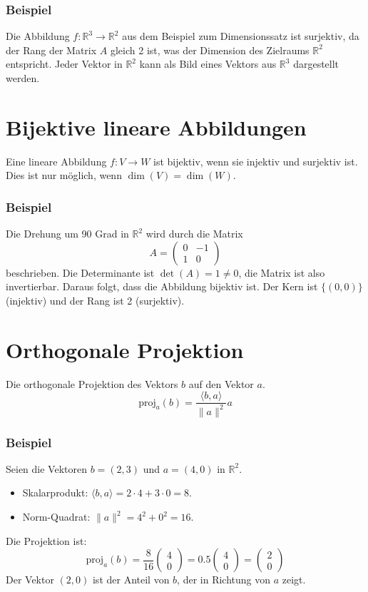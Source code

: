 \subsubsection{Beispiel}
Die Abbildung \(f: \mathbb{R}^3 \to \mathbb{R}^2\) aus dem Beispiel zum
Dimensionssatz ist surjektiv, da der Rang der Matrix \(A\) gleich 2 ist, was
der Dimension des Zielraums \(\mathbb{R}^2\) entspricht. Jeder Vektor in
\(\mathbb{R}^2\) kann als Bild eines Vektors aus \(\mathbb{R}^3\) dargestellt
werden.

\section{Bijektive lineare Abbildungen}
Eine lineare Abbildung \(f: V \to W\) ist bijektiv, wenn sie injektiv und
surjektiv ist. Dies ist nur möglich, wenn \(\dim(V) = \dim(W)\).

\subsubsection{Beispiel}
Die Drehung um 90 Grad in \(\mathbb{R}^2\) wird durch die Matrix
\[
    A = \begin{pmatrix} 0 & -1 \\ 1 & 0 \end{pmatrix}
\]
beschrieben. Die Determinante ist \(\det(A) = 1 \neq 0\), die Matrix ist also
invertierbar. Daraus folgt, dass die Abbildung bijektiv ist. Der Kern ist
\(\{(0,0)\}\) (injektiv) und der Rang ist 2 (surjektiv).

\section{Orthogonale Projektion}
Die orthogonale Projektion des Vektors \(b\) auf den Vektor \(a\).
\[
    \mathrm{proj}_{a}(b) = \frac{\langle b, a \rangle}{\|a\|^2} a
\]

\subsubsection{Beispiel}
Seien die Vektoren \(b = (2, 3)\) und \(a = (4, 0)\) in \(\mathbb{R}^2\).
\begin{itemize}
    \item Skalarprodukt: \(\langle b, a \rangle = 2 \cdot 4 + 3 \cdot 0 = 8\).
    \item Norm-Quadrat: \(\|a\|^2 = 4^2 + 0^2 = 16\).
\end{itemize}
Die Projektion ist:
\[
    \mathrm{proj}_{a}(b) = \frac{8}{16} \begin{pmatrix} 4 \\ 0 \end{pmatrix} = 0.5 \begin{pmatrix} 4 \\ 0 \end{pmatrix} = \begin{pmatrix} 2 \\ 0 \end{pmatrix}
\]
Der Vektor \((2,0)\) ist der Anteil von \(b\), der in Richtung von \(a\) zeigt.

